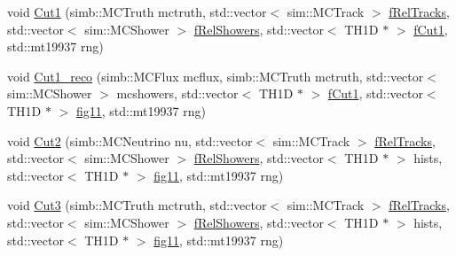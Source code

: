 \begin{DoxyCompactItemize}
\item 
void \hyperlink{namespaceana_1_1SBNOsc_aee76a04c637ea0eabf24d70fa1fa93fa}{Cut1} (simb::MCTruth mctruth, std::vector$<$ sim::MCTrack $>$ \hyperlink{namespaceana_1_1SBNOsc_a91abcb43a0813753bf8d88336515df12}{fRelTracks}, std::vector$<$ sim::MCShower $>$ \hyperlink{namespaceana_1_1SBNOsc_a835384228e9ece629d6af6a74abfadeb}{fRelShowers}, std::vector$<$ TH1D $\ast$ $>$ \hyperlink{namespaceana_1_1SBNOsc_a2b70de8a58ae31f4f22507b834355ca3}{fCut1}, std::mt19937 rng)
\item 
void \hyperlink{namespaceana_1_1SBNOsc_ab43b2a2a21ac09029397875c621110b3}{Cut1\_\-reco} (simb::MCFlux mcflux, simb::MCTruth mctruth, std::vector$<$ sim::MCShower $>$ mcshowers, std::vector$<$ TH1D $\ast$ $>$ \hyperlink{namespaceana_1_1SBNOsc_a2b70de8a58ae31f4f22507b834355ca3}{fCut1}, std::vector$<$ TH1D $\ast$ $>$ \hyperlink{namespaceana_1_1SBNOsc_a0c37526999b8777b80e9324b335de4a9}{fig11}, std::mt19937 rng)
\item 
void \hyperlink{namespaceana_1_1SBNOsc_adaef1c3b82bf0bab423a70312245059f}{Cut2} (simb::MCNeutrino nu, std::vector$<$ sim::MCTrack $>$ \hyperlink{namespaceana_1_1SBNOsc_a91abcb43a0813753bf8d88336515df12}{fRelTracks}, std::vector$<$ sim::MCShower $>$ \hyperlink{namespaceana_1_1SBNOsc_a835384228e9ece629d6af6a74abfadeb}{fRelShowers}, std::vector$<$ TH1D $\ast$ $>$ hists, std::vector$<$ TH1D $\ast$ $>$ \hyperlink{namespaceana_1_1SBNOsc_a0c37526999b8777b80e9324b335de4a9}{fig11}, std::mt19937 rng)
\item 
void \hyperlink{namespaceana_1_1SBNOsc_a24094a24b2cf1d3e69b8c2be9530863d}{Cut3} (simb::MCTruth mctruth, std::vector$<$ sim::MCTrack $>$ \hyperlink{namespaceana_1_1SBNOsc_a91abcb43a0813753bf8d88336515df12}{fRelTracks}, std::vector$<$ sim::MCShower $>$ \hyperlink{namespaceana_1_1SBNOsc_a835384228e9ece629d6af6a74abfadeb}{fRelShowers}, std::vector$<$ TH1D $\ast$ $>$ hists, std::vector$<$ TH1D $\ast$ $>$ \hyperlink{namespaceana_1_1SBNOsc_a0c37526999b8777b80e9324b335de4a9}{fig11}, std::mt19937 rng)
\end{DoxyCompactItemize}
